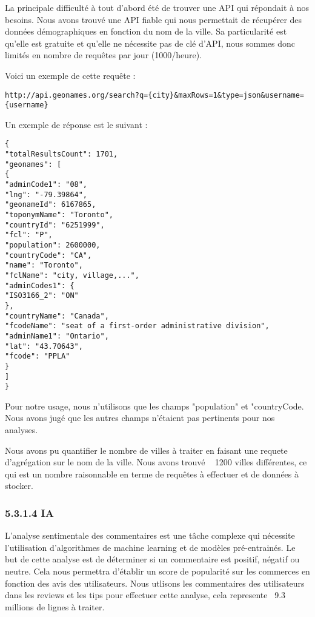 La principale difficulté à tout d'abord été de trouver une API qui répondait à nos besoins.
Nous avons trouvé une API fiable qui nous permettait de récupérer des données démographiques en fonction du nom de la ville.
Sa particularité est qu'elle est gratuite et qu'elle ne nécessite pas de clé d'API, nous sommes donc limités en nombre de requêtes par jour (1000/heure).

Voici un exemple de cette requête :

\begin{verbatim}
http://api.geonames.org/search?q={city}&maxRows=1&type=json&username={username}
\end{verbatim}

Un exemple de réponse est le suivant :

\begin{verbatim}
{
"totalResultsCount": 1701,
"geonames": [
{
"adminCode1": "08",
"lng": "-79.39864",
"geonameId": 6167865,
"toponymName": "Toronto",
"countryId": "6251999",
"fcl": "P",
"population": 2600000,
"countryCode": "CA",
"name": "Toronto",
"fclName": "city, village,...",
"adminCodes1": {
"ISO3166_2": "ON"
},
"countryName": "Canada",
"fcodeName": "seat of a first-order administrative division",
"adminName1": "Ontario",
"lat": "43.70643",
"fcode": "PPLA"
}
]
}
\end{verbatim}

Pour notre usage, nous n'utilisons que les champs "population" et "countryCode. Nous avons jugé que les autres champs n'étaient pas pertinents pour nos analyses.

Nous avons pu quantifier le nombre de villes à traiter en faisant une requete d'agrégation sur le nom de la ville.
Nous avons trouvé ~ 1200 villes différentes, ce qui est un nombre raisonnable en terme de requêtes à effectuer et de données à stocker.


\subsubsection{5.3.1.4 IA}

L'analyse sentimentale des commentaires est une tâche complexe qui nécessite l'utilisation d'algorithmes de machine learning et de modèles pré-entrainés.
Le but de cette analyse est de déterminer si un commentaire est positif, négatif ou neutre. Cela nous permettra d'établir un score de popularité sur les commerces en fonction des avis des utilisateurs.
Nous utlisons les commentaires des utilisateurs dans les reviews et les tips pour effectuer cette analyse, cela represente ~9.3 millions de lignes à traiter.


